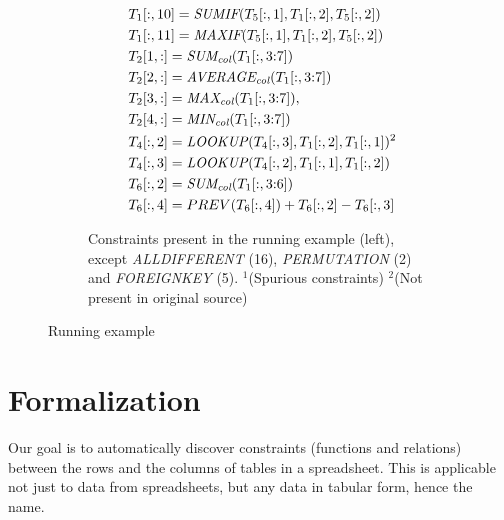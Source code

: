 \documentclass{IEEEtran}
\newcommand{\range}[3]{\ensuremath{#1[#2,#3]}}
\newcommand{\rangeto}[2]{#1{:}#2}
\newcommand{\rangeall}{:}
\newcommand{\eccalc}[2]{\ensuremath{#1 = #2}}
\newcommand{\eclookupf}[4]{\ensuremath{\textit{LOOKUP}_{\textit{#4}}(#1, #2, #3)}}
\newcommand{\eclookup}[4]{\eccalc{#1}{\eclookupf{#2}{#3}{#4}{}}}
\newcommand{\ecaggc}[3]{\eccalc{#2}{\textit{#1\textsubscript{col}}(#3)}}
\newcommand{\ecsumc}[2]{\eccalc{#1}{\textit{SUM\textsubscript{col}}(#2)}}
\newcommand{\ecaggif}[5]{\eccalc{#2}{\textit{#1IF}(#3, #4, #5)}}
\theoremstyle{definition}
\begin{document}
\begin{figure}[thb]
\begin{subfigure}{.35\textwidth}
{\begin{align*}
%
      &~\ecaggif{\textit{SUM}}{\range{T_{1}}{\rangeall}{10}}{\range{T_{5}}{\rangeall}{1}}{\range{T_{1}}{\rangeall}{2}}{\range{T_{5}}{\rangeall}{2}} \\
%
      &~\ecaggif{\textit{MAX}}{\range{T_{1}}{\rangeall}{11}}{\range{T_{5}}{\rangeall}{1}}{\range{T_{1}}{\rangeall}{2}}{\range{T_{5}}{\rangeall}{2}} \\
%
      &~\ecsumc{\range{T_{2}}{1}{\rangeall}}{\range{T_{1}}{\rangeall}{\rangeto{3}{7}}} \\
%
      &~\ecaggc{\textit{AVERAGE}}{\range{T_{2}}{2}{\rangeall}}{\range{T_{1}}{\rangeall}{\rangeto{3}{7}}} \\
%
      &~\ecaggc{\textit{MAX}}{\range{T_{2}}{3}{\rangeall}}{\range{T_{1}}{\rangeall}{\rangeto{3}{7}}},  \\
%
      &~\ecaggc{\textit{MIN}}{\range{T_{2}}{4}{\rangeall}}{\range{T_{1}}{\rangeall}{\rangeto{3}{7}}} \\
%
      &~\eclookup{\range{T_{4}}{\rangeall}{2}}{\range{T_{4}}{\rangeall}{3}}{\range{T_{1}}{\rangeall}{2}}{\range{T_{1}}{\rangeall}{1}}^2 \\
%
      &~\eclookup{\range{T_{4}}{\rangeall}{3}}{\range{T_{4}}{\rangeall}{2}}{\range{T_{1}}{\rangeall}{1}}{\range{T_{1}}{\rangeall}{2}} \\
%
      &~\ecsumc{\range{T_{6}}{\rangeall}{2}}{\range{T_{1}}{\rangeall}{\rangeto{3}{6}}} \\
%
      &~\range{T_{6}}{\rangeall}{4} = PREV(\range{T_{6}}{\rangeall}{4}) + \range{T_{6}}{\rangeall}{2} - \range{T_{6}}{\rangeall}{3}
    \end{align*}}
  \vspace{-10pt}
  \caption{Constraints present in the running example (left), except \textit{ALLDIFFERENT} (16), \textit{PERMUTATION} (2) and \textit{FOREIGNKEY} (5).
  $^1$(Spurious constraints) $^2$(Not present in original source)}
  \label{fig:sol_example}
\end{subfigure}
  \caption{Running example}
\end{figure}


\section{Formalization}\label{sec:formalization}
Our goal is to automatically discover constraints (functions and relations) between the rows and the columns of tables in a spreadsheet. This is applicable not just to data from spreadsheets, but any data in tabular form, hence the name.
\end{document}
